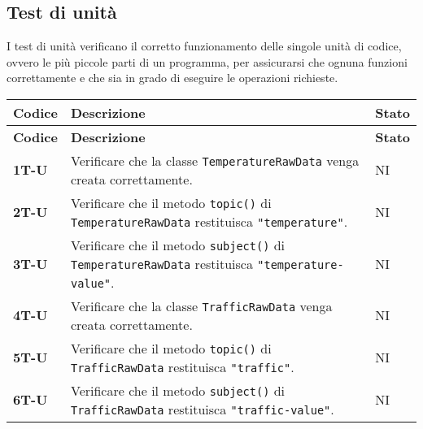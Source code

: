 \subsection{Test di unità}
I test di unità verificano il corretto funzionamento delle singole unità di codice, ovvero le più piccole parti di un programma,
per assicurarsi che ognuna funzioni correttamente e che sia in grado di eseguire le operazioni richieste. \\
\begin{longtable}{|>{\raggedright\arraybackslash}m{}|>{\raggedright\arraybackslash}m{}|>{\raggedright\arraybackslash}m{}|}
	\hline
	\textbf{Codice} & \textbf{Descrizione}                                                                                                                                              & \textbf{Stato} \\
	\hline
	\endfirsthead
	\hline
	\textbf{Codice} & \textbf{Descrizione}                                                                                                                                              & \textbf{Stato} \\
	\endhead
	\hline
	\textbf{1T-U}   & Verificare che la classe \texttt{TemperatureRawData} venga creata correttamente.                                                                                  & NI             \\
	\hline
	\textbf{2T-U}   & Verificare che il metodo \texttt{topic()} di \texttt{TemperatureRawData} restituisca \texttt{"temperature"}.                                                      & NI             \\
	\hline
	\textbf{3T-U}   & Verificare che il metodo \texttt{subject()} di \texttt{TemperatureRawData} restituisca \texttt{"temperature-value"}.                                              & NI             \\
	\hline
	\textbf{4T-U}   & Verificare che la classe \texttt{TrafficRawData} venga creata correttamente.                                                                                      & NI             \\
	\hline
	\textbf{5T-U}   & Verificare che il metodo \texttt{topic()} di \texttt{TrafficRawData} restituisca \texttt{"traffic"}.                                                              & NI             \\
	\hline
	\textbf{6T-U}   & Verificare che il metodo \texttt{subject()} di \texttt{TrafficRawData} restituisca \texttt{"traffic-value"}.                                                      & NI             \\

\end{longtable}
